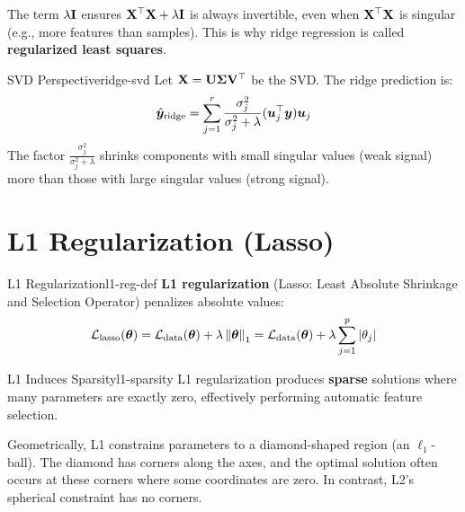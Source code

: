 \documentclass[../../main.tex]{subfiles}
\begin{document}
\begin{keyconcept}
The term $\lambda\mathbf{I}$ ensures $\mathbf{X}^\top\mathbf{X} + \lambda\mathbf{I}$ is always invertible, even when $\mathbf{X}^\top\mathbf{X}$ is singular (e.g., more features than samples). This is why ridge regression is called \textbf{regularized least squares}.
\end{keyconcept}

\begin{theorem}{SVD Perspective}{ridge-svd}
Let $\mathbf{X} = \mathbf{U}\mathbf{\Sigma}\mathbf{V}^\top$ be the SVD. The ridge prediction is:
\[
    \hat{\boldsymbol{y}}_{\text{ridge}} = \sum_{j=1}^{r} \frac{\sigma_j^2}{\sigma_j^2 + \lambda} (\boldsymbol{u}_j^\top \boldsymbol{y})\boldsymbol{u}_j
\]
The factor $\frac{\sigma_j^2}{\sigma_j^2 + \lambda}$ shrinks components with small singular values (weak signal) more than those with large singular values (strong signal).
\end{theorem}

\section{L1 Regularization (Lasso)}
\label{sec:l1-regularization}

\begin{definition}{L1 Regularization}{l1-reg-def}
\textbf{L1 regularization} (Lasso: Least Absolute Shrinkage and Selection Operator) penalizes absolute values:
\[
    \mathcal{L}_{\text{lasso}}(\boldsymbol{\theta}) = \mathcal{L}_{\text{data}}(\boldsymbol{\theta}) + \lambda\left\lVert \boldsymbol{\theta} \right\rVert_1 = \mathcal{L}_{\text{data}}(\boldsymbol{\theta}) + \lambda\sum_{j=1}^{p} |\theta_j|
\]
\end{definition}

\begin{theorem}{L1 Induces Sparsity}{l1-sparsity}
L1 regularization produces \textbf{sparse} solutions where many parameters are exactly zero, effectively performing automatic feature selection.
\end{theorem}

\begin{intuition}
Geometrically, L1 constrains parameters to a diamond-shaped region (an $\ell_1$-ball). The diamond has corners along the axes, and the optimal solution often occurs at these corners where some coordinates are zero. In contrast, L2's spherical constraint has no corners.
\end{intuition}
\end{document}
